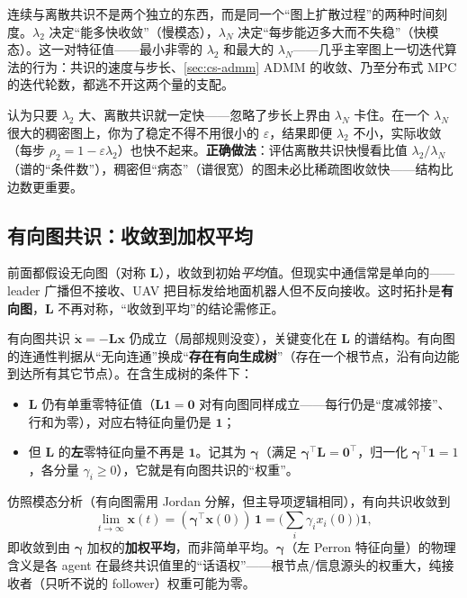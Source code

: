 \begin{insight}\label{ins:cs-two-eig}
连续与离散共识不是两个独立的东西，而是同一个“图上扩散过程”的两种时间刻度。$\lambda_2$ 决定“能多快收敛”（慢模态），$\lambda_N$ 决定“每步能迈多大而不失稳”（快模态）。这一对特征值——最小非零的 $\lambda_2$ 和最大的 $\lambda_N$——几乎主宰图上一切迭代算法的行为：共识的速度与步长、\cref{sec:cs-admm} ADMM 的收敛、乃至分布式 MPC 的迭代轮数，都逃不开这两个量的支配。
\end{insight}

\begin{pitfall}
认为只要 $\lambda_2$ 大、离散共识就一定快——忽略了步长上界由 $\lambda_N$ 卡住。在一个 $\lambda_N$ 很大的稠密图上，你为了稳定不得不用很小的 $\varepsilon$，结果即便 $\lambda_2$ 不小，实际收敛（每步 $\rho_2=1-\varepsilon\lambda_2$）也快不起来。\textbf{正确做法}：评估离散共识快慢看比值 $\lambda_2/\lambda_N$（谱的“条件数”），稠密但“病态”（谱很宽）的图未必比稀疏图收敛快——结构比边数更重要。
\end{pitfall}

\subsection{有向图共识：收敛到加权平均}
\label{sec:cs-directed}

前面都假设无向图（对称 $\mathbf{L}$），收敛到初始\emph{平均}值。但现实中通信常是单向的——leader 广播但不接收、UAV 把目标发给地面机器人但不反向接收。这时拓扑是\textbf{有向图}，$\mathbf{L}$ 不再对称，“收敛到平均”的结论需修正。

有向图共识 $\dot{\mathbf{x}}=-\mathbf{L}\mathbf{x}$ 仍成立（局部规则没变），关键变化在 $\mathbf{L}$ 的谱结构。有向图的连通性判据从“无向连通”换成“\textbf{存在有向生成树}”（存在一个根节点，沿有向边能到达所有其它节点）。在含生成树的条件下：
\begin{itemize}
  \item $\mathbf{L}$ 仍有单重零特征值（$\mathbf{L}\mathbf{1}=\mathbf{0}$ 对有向图同样成立——每行仍是“度减邻接”、行和为零），对应右特征向量仍是 $\mathbf{1}$；
  \item 但 $\mathbf{L}$ 的\textbf{左}零特征向量不再是 $\mathbf{1}$。记其为 $\boldsymbol{\gamma}$（满足 $\boldsymbol{\gamma}^\top\mathbf{L}=\mathbf{0}^\top$，归一化 $\boldsymbol{\gamma}^\top\mathbf{1}=1$，各分量 $\gamma_i\ge0$），它就是有向图共识的“权重”。
\end{itemize}
仿照模态分析（有向图需用 Jordan 分解，但主导项逻辑相同），有向共识收敛到
\begin{equation}
  \lim_{t\to\infty}\mathbf{x}(t)=(\boldsymbol{\gamma}^\top\mathbf{x}(0))\,\mathbf{1}=\Big(\sum_i\gamma_i x_i(0)\Big)\mathbf{1},
  \label{eq:cs-directed-avg}
\end{equation}
即收敛到由 $\boldsymbol{\gamma}$ 加权的\textbf{加权平均}，而非简单平均\cite{olfatisaber2007consensus}。$\boldsymbol{\gamma}$（左 Perron 特征向量）的物理含义是各 agent 在最终共识值里的“话语权”——根节点/信息源头的权重大，纯接收者（只听不说的 follower）权重可能为零。


